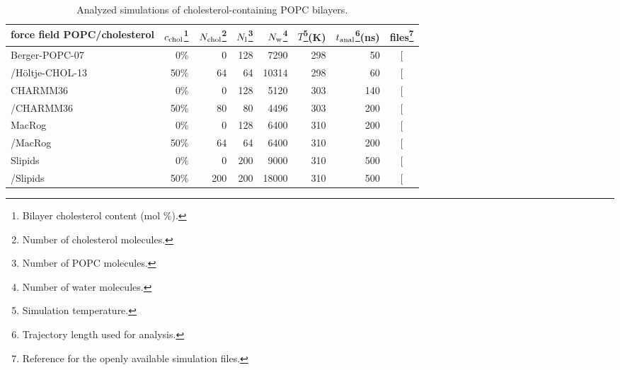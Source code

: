 \documentclass[journal=jpcbfk,manuscript=article,layout=twocolumn]{achemso}
\begin{document}
\begin{table}[]
\caption{Analyzed simulations of cholesterol-containing POPC bilayers.}
\begin{minipage}[t]{\columnwidth}
\resizebox{\columnwidth}{!} {
\begin{tabular}{lrrrrrrc}
force field POPC/cholesterol &
$c_{{\rm chol}}$\footnote{Bilayer cholesterol content (mol \%).}  &
$N_{\rm chol}$\footnote{Number of cholesterol molecules.}  &
$N_{\rm l}$\footnote{Number of POPC molecules.} &
$N_{\rm w}$\footnote{Number of water molecules.}  &
$T$\footnote{Simulation temperature.}(K) &
$t_{{\rm anal}}$\footnote{Trajectory length used for analysis.}(ns) &
files\footnote{Reference for the openly available simulation files.} 
\tabularnewline
\hline 
Berger-POPC-07~\cite{ollila07a}
	& 0\%	& 0	& 128	& 7290  & 298  & 50 & {[}\!\!\citenum{bergerFILESpopc}{]} \tabularnewline
/H\"{o}ltje-CHOL-13~\cite{holtje01,ferreira13} 
	& 50\%	& 64	& 64		& 10314  & 298  & 60  & {[}\!\!\citenum{bergerFILESpopc50chol}{]} \tabularnewline[1.0ex]
CHARMM36~\cite{klauda10} 
	& 0\%	& 0 	& 128 	& 5120  & 303  & 140  & {[}\!\!\citenum{charmm36files}{]} \tabularnewline
/CHARMM36~\cite{lim12} 
 	& 50\%	& 80	& 80		& 4496  & 303  & 200  & {[}\!\!\citenum{charmm36files50perCHOL}{]} \tabularnewline[1.0ex]
MacRog~\cite{kulig15}
	& 0\%	& 0	& 128	& 6400  & 310  & 200  & {[}\!\!\citenum{macrogCHOLfiles}{]} \tabularnewline
/MacRog~\cite{kulig15}
 	& 50\%	& 64	& 64		& 6400  & 310  & 200  & {[}\!\!\citenum{macrogCHOLfiles}{]} \tabularnewline[1.0ex]
Slipids~\cite{jambeck12b}
	& 0\%	& 0	& 200	& 9000 & 310 & 500  & {[}\!\!\citenum{slipidsFILESpopcchol}{]} \tabularnewline
/Slipids~\cite{jambeck13chol}
 	& 50\%	&200& 200	& 18000 & 310 & 500 & {[}\!\!\citenum{slipidsFILESpopcchol}{]}\tabularnewline
\end{tabular}
}
\end{minipage}
\label{tab:chol}
\end{table}
\end{document}
